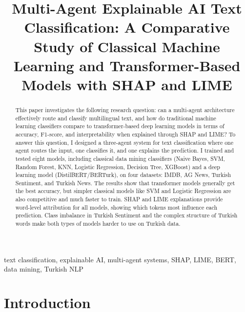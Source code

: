 \documentclass[conference]{IEEEtran}
\begin{document}
\title{Multi-Agent Explainable AI Text Classification: A Comparative Study
	of Classical Machine Learning and Transformer-Based Models with SHAP and LIME\\
}

\author{
}

\maketitle

\begin{abstract}
This paper investigates the following research question: can a multi-agent architecture
effectively route and classify multilingual text, and how do traditional machine learning
classifiers compare to transformer-based deep learning models in terms of accuracy,
F1-score, and interpretability when explained through SHAP and LIME? To answer this
question, I designed a three-agent system for text classification where one agent routes
the input, one classifies it, and one explains the prediction. I trained and tested eight
models, including classical data mining classifiers (Naive Bayes, SVM, Random Forest, KNN,
Logistic Regression, Decision Tree, XGBoost) and a deep learning model (DistilBERT/BERTurk),
on four datasets: IMDB, AG News, Turkish Sentiment, and Turkish News. The results show that
transformer models generally get the best accuracy, but simpler classical models like SVM
and Logistic Regression are also competitive and much faster to train. SHAP and LIME explanations provide word-level attribution for all models, showing which
tokens most influence each prediction. Class imbalance in Turkish Sentiment and the complex
structure of Turkish words make both types of models harder to use on Turkish data.
\end{abstract}

\begin{IEEEkeywords}
text classification, explainable AI, multi-agent systems, SHAP, LIME, BERT, data mining,
Turkish NLP
\end{IEEEkeywords}

\section{Introduction}
\label{sec:introduction}
\end{document}
